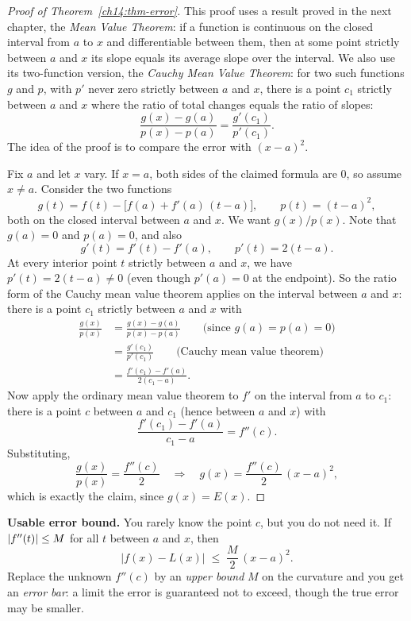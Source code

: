 \begin{proof}[Proof of Theorem~\ref{ch14:thm-error}]
This proof uses a result proved in the next chapter, the \emph{Mean Value
Theorem}: if a function is continuous on the closed interval from $a$ to $x$ and
differentiable between them, then at some point strictly between $a$ and $x$ its
slope equals its average slope over the interval. We also use its two-function
version, the \emph{Cauchy Mean Value Theorem}: for two such functions $g$ and $p$,
with $p'$ never zero strictly between $a$ and $x$, there is a point $c_1$ strictly
between $a$ and $x$ where the ratio of total changes equals the ratio of slopes:
\[
\frac{g(x)-g(a)}{p(x)-p(a)} = \frac{g'(c_1)}{p'(c_1)}.
\]
The idea of the proof is to compare the error with $(x-a)^2$.

Fix $a$ and let $x$ vary. If $x=a$, both sides of the claimed formula are $0$, so
assume $x\neq a$. Consider the two functions
\[
g(t) = f(t) - \bigl[f(a)+f'(a)\,(t-a)\bigr],
\qquad
p(t) = (t-a)^2,
\]
both on the closed interval between $a$ and $x$. We want $g(x)/p(x)$. Note that
$g(a)=0$ and $p(a)=0$, and also
\[
g'(t) = f'(t) - f'(a), \qquad p'(t) = 2(t-a).
\]
At every interior point $t$ strictly between $a$ and $x$, we have $p'(t)=2(t-a)\neq 0$
(even though $p'(a)=0$ at the endpoint). So the ratio form of the Cauchy mean value
theorem applies on the interval between $a$ and $x$: there is a point $c_1$ strictly
between $a$ and $x$ with
\begin{align*}
\frac{g(x)}{p(x)} &= \frac{g(x)-g(a)}{p(x)-p(a)} \qquad \text{(since $g(a)=p(a)=0$)}\\
&= \frac{g'(c_1)}{p'(c_1)} \qquad \text{(Cauchy mean value theorem)}\\
&= \frac{f'(c_1)-f'(a)}{2(c_1-a)}.
\end{align*}
Now apply the ordinary mean value theorem to $f'$ on the interval from $a$ to
$c_1$: there is a point $c$ between $a$ and $c_1$ (hence between $a$ and $x$) with
\[
\frac{f'(c_1)-f'(a)}{c_1-a} = f''(c).
\]
Substituting,
\[
\frac{g(x)}{p(x)} = \frac{f''(c)}{2}
\quad\Longrightarrow\quad
g(x) = \frac{f''(c)}{2}\,(x-a)^2,
\]
which is exactly the claim, since $g(x)=E(x)$.
\end{proof}

\begin{focusbox}
\textbf{Usable error bound.} You rarely know the point $c$, but you do not
need it. If $\lvert f''(t)\rvert\le M$ for all $t$ between $a$ and $x$, then
\[
\bigl|f(x)-L(x)\bigr| \;\le\; \frac{M}{2}\,(x-a)^2.
\]
Replace the unknown $f''(c)$ by an \emph{upper bound} $M$ on the curvature and you get
an \emph{error bar}: a limit the error is guaranteed not to exceed, though the true
error may be smaller.
\end{focusbox}

